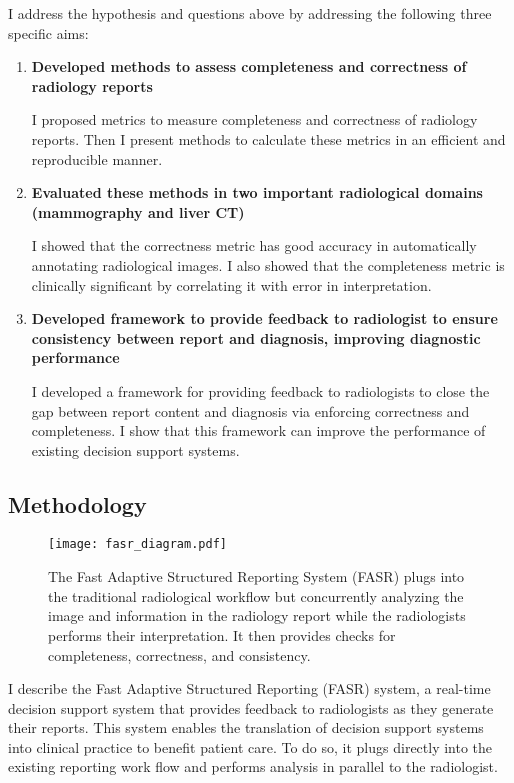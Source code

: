 I address the hypothesis and questions above by addressing the following three specific aims:

\begin{enumerate}
	\item \textbf{Developed methods to assess completeness and correctness of radiology reports}
	
	I proposed metrics to measure completeness and correctness of radiology reports. Then I present methods to calculate these metrics in an efficient and reproducible manner.
	
	\item \textbf{Evaluated these methods in two important radiological domains (mammography and liver CT)}
	
	I showed that the correctness metric has good accuracy in automatically annotating radiological images. I also showed that the completeness metric is clinically significant by correlating it with error in interpretation.
	
	\item \textbf{Developed framework to provide feedback to radiologist to ensure consistency between report and diagnosis, improving diagnostic performance}
	
	I developed a framework for providing feedback to radiologists to close the gap between report content and diagnosis via enforcing correctness and completeness. I show that this framework can improve the performance of existing decision support systems.
\end{enumerate}

\subsection{Methodology}

\begin{figure}[h]
	\centering
	\texttt{[image: fasr\_diagram.pdf]}
	\caption[Overview of the Fast Adaptive Structured Reporting (FASR) system]{The Fast Adaptive Structured Reporting System (FASR) plugs into the traditional radiological workflow but concurrently analyzing the image and information in the radiology report while the radiologists performs their interpretation. It then provides checks for completeness, correctness, and consistency.}
	\label{fig:fasr_diagram}
\end{figure}

I describe the Fast Adaptive Structured Reporting (FASR) system, a real-time decision support system that provides feedback to radiologists as they generate their reports. 
This system enables the translation of decision support systems into clinical practice to benefit patient care. 
To do so, it plugs directly into the existing reporting work flow and performs analysis in parallel to the radiologist.

